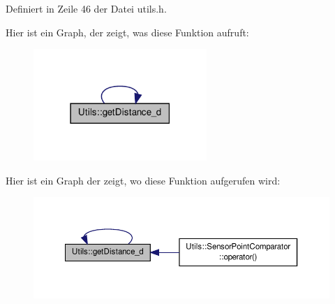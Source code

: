 Definiert in Zeile 46 der Datei utils.\-h.



Hier ist ein Graph, der zeigt, was diese Funktion aufruft\-:\nopagebreak
\begin{figure}[H]
\begin{center}
\leavevmode
\includegraphics[width=186pt]{namespaceUtils_ac924242f1790eaecb91b4965d3a661aa_cgraph}
\end{center}
\end{figure}




Hier ist ein Graph der zeigt, wo diese Funktion aufgerufen wird\-:\nopagebreak
\begin{figure}[H]
\begin{center}
\leavevmode
\includegraphics[width=350pt]{namespaceUtils_ac924242f1790eaecb91b4965d3a661aa_icgraph}
\end{center}
\end{figure}



